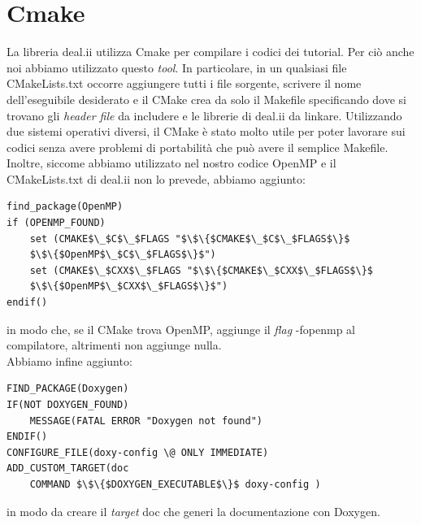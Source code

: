\documentclass[a4paper,10pt]{report}
\theoremstyle{plain}
\theoremstyle{definition}
\theoremstyle{remark}
\begin{document}
\section{\textsf{Cmake}}
La libreria \textsf{deal.ii} utilizza \textsf{Cmake} per compilare i codici dei tutorial. Per ci\`o anche noi abbiamo utilizzato questo \emph{tool}. In particolare, in un qualsiasi file \textsf{CMakeLists.txt} occorre aggiungere tutti i file sorgente, scrivere il nome dell'eseguibile desiderato e il \textsf{CMake} crea da solo il \textsf{Makefile} specificando dove si trovano gli \emph{header file} da includere e le librerie di \textsf{deal.ii} da linkare. Utilizzando due sistemi operativi diversi, il \textsf{CMake} \`e stato molto utile per poter lavorare sui codici senza avere problemi di portabilit\`a che pu\`o avere il semplice \textsf{Makefile}. Inoltre, siccome abbiamo utilizzato nel nostro codice \textsf{OpenMP} e il \textsf{CMakeLists.txt} di \textsf{deal.ii} non lo prevede, abbiamo aggiunto:
\begin{lstlisting}
find_package(OpenMP)
if (OPENMP_FOUND)
    set (CMAKE$\_$C$\_$FLAGS "$\$\{$CMAKE$\_$C$\_$FLAGS$\}$
	$\$\{$OpenMP$\_$C$\_$FLAGS$\}$")
    set (CMAKE$\_$CXX$\_$FLAGS "$\$\{$CMAKE$\_$CXX$\_$FLAGS$\}$
	$\$\{$OpenMP$\_$CXX$\_$FLAGS$\}$")
endif()
\end{lstlisting}
in modo che, se il \textsf{CMake} trova \textsf{OpenMP}, aggiunge il \emph{flag} \textsf{-fopenmp} al compilatore, altrimenti non aggiunge nulla.\\Abbiamo infine aggiunto:
\begin{lstlisting}
FIND_PACKAGE(Doxygen)
IF(NOT DOXYGEN_FOUND)
	MESSAGE(FATAL ERROR "Doxygen not found")
ENDIF()
CONFIGURE_FILE(doxy-config \@ ONLY IMMEDIATE)
ADD_CUSTOM_TARGET(doc
	COMMAND $\$\{$DOXYGEN_EXECUTABLE$\}$ doxy-config )
\end{lstlisting}
in modo da creare il \emph{target} \textsf{doc} che generi la documentazione con \textsf{Doxygen}.
\end{document}
